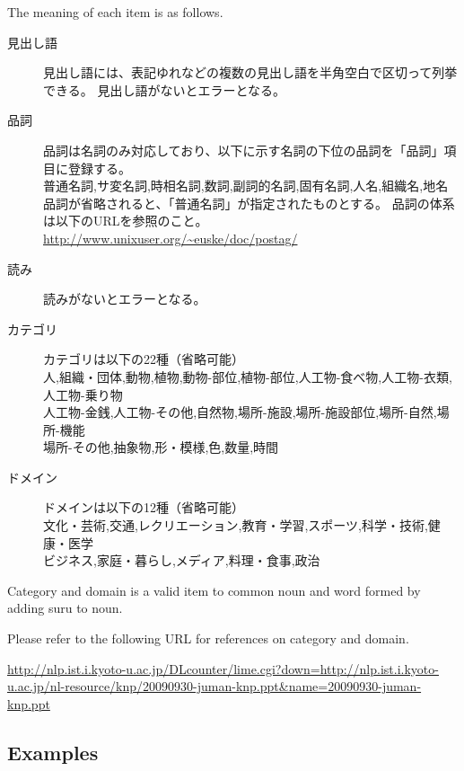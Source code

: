 The meaning of each item is as follows.  

\begin{description}
\item[見出し語]
見出し語には、表記ゆれなどの複数の見出し語を半角空白で区切って列挙できる。
見出し語がないとエラーとなる。
\item[品詞]
品詞は名詞のみ対応しており、以下に示す名詞の下位の品詞を「品詞」項目に登録する。\\
普通名詞,サ変名詞,時相名詞,数詞,副詞的名詞,固有名詞,人名,組織名,地名\\
品詞が省略されると、「普通名詞」が指定されたものとする。
品詞の体系は以下のURLを参照のこと。
\url{http://www.unixuser.org/~euske/doc/postag/}
\item[読み]
読みがないとエラーとなる。
\item[カテゴリ]
カテゴリは以下の22種（省略可能）\\
人,組織・団体,動物,植物,動物-部位,植物-部位,人工物-食べ物,人工物-衣類,人工物-乗り物\\
人工物-金銭,人工物-その他,自然物,場所-施設,場所-施設部位,場所-自然,場所-機能\\
場所-その他,抽象物,形・模様,色,数量,時間
\item[ドメイン]
ドメインは以下の12種（省略可能）\\
文化・芸術,交通,レクリエーション,教育・学習,スポーツ,科学・技術,健康・医学\\
ビジネス,家庭・暮らし,メディア,料理・食事,政治\\
\end{description}

Category and domain is a valid item to common noun and word formed by adding suru to noun. 
 
 Please refer to the following URL for references on category and domain. 

\url{http://nlp.ist.i.kyoto-u.ac.jp/DLcounter/lime.cgi?down=http://nlp.ist.i.kyoto-u.ac.jp/nl-resource/knp/20090930-juman-knp.ppt&name=20090930-juman-knp.ppt}






\subsection{Examples}


%


